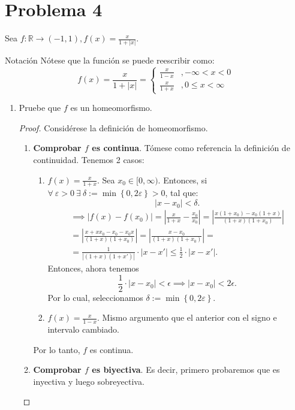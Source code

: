 \section{Problema 4}

Sea $f: \mathbb{R} \rightarrow(-1,1), f(x)=\frac{x}{1+|x|}$.

\begin{noter}{Notación}
		Nótese que la función se puede reescribir como: 
		$$f(x)=\frac{x}{1+|x|}=\begin{cases}
			\frac{x}{1-x} &,  -\infty<x<0  \\
			\frac{x}{1+x}&,  0\leq x<\infty 
		\end{cases}$$
\end{noter}
\begin{enumerate}
	\item Pruebe que $f$ es un homeomorfismo.
	\begin{proof}
		Considérese la definición de homeomorfismo. 
		\begin{enumerate}
			\item \textbf{Comprobar $f$ es continua}. Tómese como referencia la definición de continuidad. Tenemos 2 casos: 
			\begin{enumerate}
				\item $f(x)=\frac{x}{1+x}$.  Sea $x_0\in [0,\infty)$. Entonces, si $\forall \ \varepsilon > 0 \ \exists \ \delta:=\min\left\{0,2\varepsilon\right\} >0$, tal que: 
				$$|x-x_0|< \delta.$$
				\begin{align*}
					\implies |f(x)-f(x_0)|=\left|\frac{x}{1+x}-\frac{x_0}{x_0}\right|=\left|\frac{x(1+x_0)-x_0(1+x)}{(1+x)(1+x_0)}\right|\\=\left|\frac{x+xx_0-x_0-x_0x}{(1+x)(1+x_0)}\right|
					= \left|\frac{x-x_0}{(1+x)(1+x_0)}\right|=\\ =\frac{1}{\left|(1+x)(1+x')\right|}\cdot \left|x-x'\right|\leq \frac{1}{2}\cdot \left|x-x'\right|. 
				\end{align*} 
			Entonces, ahora tenemos 
			$$\frac{1}{2}\cdot \left|x-x_0\right|< \epsilon \implies \left|x-x_0\right|< 2\epsilon.$$
			Por lo cual, seleccionamos $\delta:=\min\left\{0,2\varepsilon\right\}.$ 
				\item $f(x)=\frac{x}{1-x}$.  Mismo argumento que el anterior con el signo e intervalo cambiado. 
			\end{enumerate}
		Por lo tanto, $f$ es continua.
			\item \textbf{Comprobar $f$ es biyectiva}. Es decir, primero probaremos que es inyectiva y luego sobreyectiva. 
			\begin{enumerate}

\end{enumerate}
\end{enumerate}
\end{proof}
\end{enumerate}
